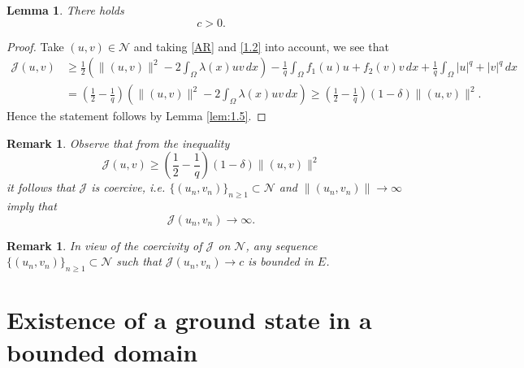 \documentclass{scrartcl}
\newtheorem{Lem}[Th]{Lemma}
\newtheorem{Rem}[Th]{Remark}
\newcommand{\cJ}{{\mathcal J}}
\newcommand{\cN}{{\mathcal N}}
\numberwithin{equation}{section}
\begin{document}
\begin{Lem}
There holds
$$
c > 0.
$$
\end{Lem}

\begin{proof}
Take $(u,v) \in \cN$ and taking \eqref{AR} and \eqref{1.2} into account, we see that
\begin{align*}
\cJ(u,v) &\geq \frac{1}{2} \left( \|(u,v)\|^2 - 2 \int_{\Omega} \lambda(x) uv \, dx \right) - \frac{1}{q} \int_{\Omega} f_1(u)u + f_2(v)v \, dx + \frac{1}{q} \int_{\Omega} |u|^q + |v|^q \, dx \\
&= \left(\frac{1}{2} - \frac{1}{q} \right) \left( \|(u,v)\|^2 - 2 \int_{\Omega} \lambda(x) uv \, dx \right) \geq \left(\frac{1}{2} - \frac{1}{q} \right) (1 - \delta) \|(u,v)\|^2.
\end{align*}
Hence the statement follows by Lemma \ref{lem:1.5}.
\end{proof}

\begin{Rem}
Observe that from the inequality
$$
\cJ(u,v) \geq \left(\frac{1}{2} - \frac{1}{q} \right) (1 - \delta) \|(u,v)\|^2
$$
it follows that $\cJ$ is coercive, i.e. $\{ (u_n,v_n) \}_{n \geq 1} \subset \cN$ and $\|(u_n, v_n)\| \to \infty$ imply that $$\cJ(u_n, v_n) \to \infty.$$
\end{Rem}

\begin{Rem}\label{rem:1.10}
In view of the coercivity of $\cJ$ on $\cN$, any sequence $\{ (u_n, v_n) \}_{n \geq 1} \subset \cN$ such that $\cJ(u_n, v_n) \to c$ is bounded in $E$.
\end{Rem}

\section{Existence of a ground state in a bounded domain}\label{sect:3}
\end{document}
